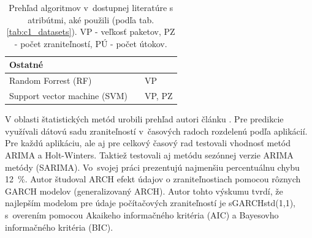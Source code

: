 \documentclass[thesismargins, thesislinespacing, openright, upjsfrontpage]{rnthesis}
\begin{document}
\begin{table}
\begin{tabular}{ | p{6cm} | p{4cm} | p{4cm} | }
         \hline \multicolumn{2}{l}{\textbf{Ostatné}} \\
         \hline Random Forrest (RF) & \cite{liu2015cloudy} & VP \\
         \hline Support vector machine (SVM) & \cite{liu2015cloudy,hasegawa2001applications,Leau2015,pokhrel2017cybersecurity} & VP, PZ \\
         
         
        
         \hline
    \end{tabular}
    \caption{Prehľad algoritmov v~dostupnej literatúre s atribútmi, aké použili (podľa tab. \ref{tab:c1_datasets}). VP - veľkosť paketov, PZ - počet zraniteľností, PÚ - počet útokov.}
    \label{tab:c2_alg}
\end{table}

V oblasti štatistických metód urobili prehľad autori článku \cite{roumani2015time}. Pre predikcie využívali dátovú sadu zraniteľností v~časových radoch rozdelenú podľa aplikácií. Pre každú aplikáciu, ale aj pre celkový časový rad testovali vhodnosť metód ARIMA a Holt-Winters. Taktiež testovali aj metódu sezónnej verzie ARIMA metódy (SARIMA). Vo~svojej práci prezentujú najmenšiu percentuálnu chybu 12~\%. Autor \cite{tang2018disclosure} študoval ARCH efekt údajov o zraniteľnostiach pomocou rôznych GARCH modelov (generalizovaný ARCH). Autor tohto výskumu tvrdí, že najlepším modelom pre údaje počítačových zraniteľností je sGARCHstd(1,1), s~overením pomocou Akaikeho informačného kritéria (AIC) a Bayesovho informačného kritéria (BIC).
\end{document}
